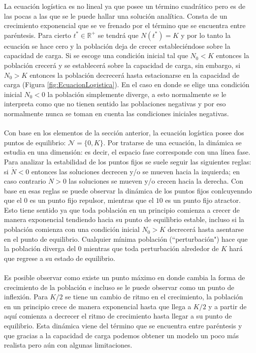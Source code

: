 La ecuación logística es no lineal ya que posee un término cuadrático pero es de las pocas a las que se le puede hallar una solución analítica. Consta de un crecimiento exponencial que se ve frenado por el término que se encuentra entre paréntesis. Para cierto $t^*\in\mathbb{R}^+$ se tendrá que $N(t^*)=K$ y por lo tanto la ecuación se hace cero y la población deja de crecer estableciéndose sobre la capacidad de carga. Si se escoge una condición inicial tal que $N_0<K$ entonces la población crecerá y se establecerá sobre la capacidad de carga,  sin embargo, si $N_0>K$ entonces la población decrecerá hasta estacionarse en la capacidad de carga (Figura \ref{fig:EcuacionLogistica}). En el caso en donde se elige una condición inicial $N_0<0$ la población simplemente diverge, a esto normalmente se le interpreta como que no tienen sentido las poblaciones negativas y por eso normalmente nunca se toman en cuenta las condiciones iniciales negativas. \\
\\
Con base en los elementos de la sección anterior, la ecuación logística posee dos puntos de equilibrio: $\mathcal{N}=\{0,K\}$. Por tratarse de una ecuación, la dinámica se estudia en una dimensión: es decir, el espacio fase corresponde con una línea fase. Para analizar la estabilidad de los puntos fijos se suele seguir las siguientes reglas: si $\dot{N}<0$ entonces las soluciones decrecen y/o se mueven hacia la izquierda; en caso contrario $\dot{N}>0$ las soluciones se mueven y/o crecen hacia la derecha. Con base en esas reglas se puede observar la dinámica de los puntos fijos conlcuyenndo que el $0$ es un punto fijo repulsor, mientras que el $10$ es un punto fijo atractor. Esto tiene sentido ya que toda población en un principio comienza a crecer de manera exponencial tendiendo hacia su punto de equilibrio estable, incluso si la población comienza con una condición inicial $N_0>K$ decrecerá hasta asentarse en el punto de equilibrio. Cualquier mínima población (``perturbación") hace que la población diverga del 0 mientras que toda perturbación alrededor de $K$ hará que regrese a su estado de equilibrio.\\
\\
Es posible observar como existe un punto máximo en donde cambia la forma de crecimiento de la población e incluso se le puede observar como un punto de inflexión. Para $K/2$ se tiene un cambio de ritmo en el crecimiento, la población en un principio crece de manera exponencial hasta que llega a $K/2$ y a partir de aquí comienza a decrecer el ritmo de crecimiento hasta llegar a su punto de equilibrio. Esta dinámica viene del término que se encuentra entre paréntesis y que gracias a la capacidad de carga podemos obtener un modelo un poco más realista pero aún con algunas limitaciones.\\
